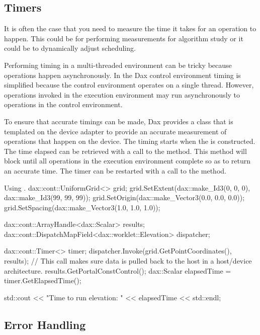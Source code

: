 \subsection{Timers}
\label{sec:Timers}


It is often the case that you need to measure the time it takes for an
operation to happen. This could be for performing measurements for
algorithm study or it could be to dynamically adjust scheduling.

Performing timing in a multi-threaded environment can be tricky because
operations happen asynchronously. In the Dax control environment timing is
simplified because the control environment operates on a single
thread. However, operations invoked in the execution environment may run
asynchronously to operations in the control environment.

To ensure that accurate timings can be made, Dax provides a 
class that is templated on the device adapter to provide an accurate
measurement of operations that happen on the device. The timing starts when
the  is constructed. The time elapsed can be
retrieved with a call to the  method. This method
will block until all operations in the execution environment complete so as
to return an accurate time. The timer can be restarted with a call to the
 method.

\begin{daxexample}{Using \protect{}.}
dax::cont::UniformGrid<> grid;
grid.SetExtent(dax::make_Id3(0, 0, 0), dax::make_Id3(99, 99, 99));
grid.SetOrigin(dax::make_Vector3(0.0, 0.0, 0.0));
grid.SetSpacing(dax::make_Vector3(1.0, 1.0, 1.0));

dax::cont::ArrayHandle<dax::Scalar> results;
dax::cont::DispatchMapField<dax::worklet::Elevation> dispatcher;

dax::cont::Timer<> timer;
dispatcher.Invoke(grid.GetPointCoordinates(), results);
// This call makes sure data is pulled back to the host in a host/device architecture.
results.GetPortalConstControl();
dax::Scalar elapsedTime = timer.GetElapsedTime();

std::cout << "Time to run elevation: " << elapsedTime << std::endl;
\end{daxexample}


\subsection{Error Handling}
\label{sec:ErrorHandlingControl}

